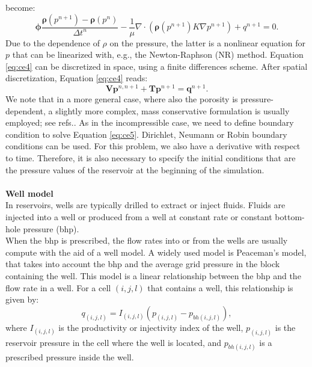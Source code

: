 \documentclass[review]{elsarticle}
\begin{document}
become:
\begin{equation}\label{eq:ce4}
 \mathbf{\phi}\frac{\mathbf{\rho}({p}^{n+1})
 -\mathbf{\rho}({p}^{n})}{\Delta t^n}
 -\frac{1}{\mu}\nabla \cdot (\mathbf{\rho}({p}^{n+1}) 
 {K}\nabla{p}^{n+1})+{q}^{n+1}=0.
\end{equation}
Due to the dependence of $\rho$ on the pressure, the latter is a nonlinear equation for $p$ that can be linearized with, e.g., the Newton-Raphson (NR) method.
Equation \eqref{eq:ce4} can be discretized in space, using a finite differences scheme. After spatial discretization, Equation \eqref{eq:ce4} reads:
\begin{equation}\label{eq:ce5}
\mathbf{V}\mathbf{{p}}^{n,n+1}+\mathbf{T}\mathbf{p}^{n+1}=\mathbf{q}^{n+1}.
\end{equation}
We note that in a more general case, where also the porosity is pressure-dependent, a slightly more complex, mass conservative formulation is usually employed; see refs.\cite{Aziz79,Chen06,Jansen13}. As in the incompressible case, we need to define boundary condition to solve Equation \eqref{eq:ce5}. Dirichlet, Neumann or Robin boundary conditions can be used. For this problem, we also have a derivative with respect to time. Therefore, it is also necessary to specify the initial conditions that are the pressure values of the reservoir at the beginning of the simulation.\\\\
\textbf{Well model}\\
In reservoirs, wells are typically drilled to extract or inject fluids. Fluids are injected into a well or produced from a well at constant rate or constant bottom-hole pressure (bhp).\\
 When the bhp is prescribed, the flow rates into or from the wells are usually compute with the aid of a well model. 
 A widely used model is Peaceman's model, that takes into account the bhp and the average grid pressure in the block containing the well. 
This model is a linear relationship between the bhp and the flow rate in a well. For a cell $(i,j,l)$ that contains a well, this relationship is given by:
\begin{equation}\label{eq:wellm}
{q}_{(i,j,l)}={I}_{(i,j,l)}({p}_{(i,j,l)}-{p}_{bh(i,j,l)}),
\end{equation}
where ${I}_{(i,j,l)}$ is the productivity or injectivity index of the well, ${p}_{(i,j,l)}$ is the reservoir pressure in the cell 
where the well is located, 
and ${p}_{bh(i,j,l)}$ is a prescribed pressure inside the well. \\
\end{document}
